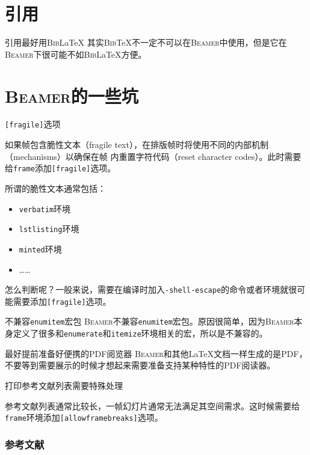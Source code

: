 \documentclass[aspectratio=169]{beamer}
\newcommand{\BibTeX}{\textsc{Bib}\TeX{}}
\newcommand{\BibLaTeX}{\textsc{Bib}\LaTeX{}}
\newcommand{\Beamer}{\textsc{Beamer}}
\newcommand{\enableindent}{\setlength{\parskip}{6pt}\setlength{\parindent}{2em}}
\begin{document}
\section{引用}

\begin{frame}{引用最好用\BibLaTeX{}}
	其实\BibTeX{}不一定不可以在\Beamer{}中使用，但是它在\Beamer{}下很可能不如\BibLaTeX{}方便。
\end{frame}

\section{\Beamer{}的一些坑}

\begin{frame}{\texttt{[fragile]}选项}
	\enableindent

	如果帧包含脆性文本（fragile text），在排版帧时将使用不同的内部机制（mechanisms）以确保在帧
	内重置字符代码（reset character codes）。此时需要给\texttt{frame}添加\texttt{[fragile]}选项。

	所谓的脆性文本通常包括：
	\begin{itemize}
		\item \texttt{verbatim}环境
		\item \texttt{lstlisting}环境
		\item \texttt{minted}环境
		\item ……
	\end{itemize}

	怎么判断呢？一般来说，需要在编译时加入\texttt{-shell-escape}的命令或者环境就很可能需要添加\texttt{[fragile]}选项。
\end{frame}

\begin{frame}{不兼容\texttt{enumitem}宏包}
	\enableindent
	\Beamer 不兼容\texttt{enumitem}宏包。原因很简单，因为\Beamer 本身定义了很多和\texttt{enumerate}和\texttt{itemize}环境相关的宏，所以是不兼容的。
\end{frame}

\begin{frame}{最好提前准备好便携的PDF阅览器}
	\enableindent
	\Beamer 和其他\LaTeX 文档一样生成的是PDF，不要等到需要展示的时候才想起来需要准备支持某种特性的PDF阅读器。
\end{frame}

\begin{frame}{打印参考文献列表需要特殊处理}

	参考文献列表通常比较长，一帧幻灯片通常无法满足其空间需求。这时候需要给\texttt{frame}环境添加\texttt{[allowframebreaks]}选项。
\end{frame}

\begin{frame}[allowframebreaks]
	\frametitle{参考文献}
	{
		\tiny
		\nocite{*}
		\printbibliography[heading=none]
	}
\end{frame}
\end{document}
